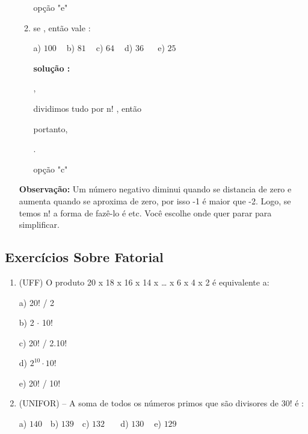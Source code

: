 \begin{multicols*}{2}
\begin{enumerate}
\begin{enumerate}


opção "e"

		\item se , então  vale :

		a) $100 \ \ \ \ $ b) $81 \ \ \ \ $ c) $64 \ \ \ \ $ d) $36 \ \ \ \ \ \ $ e) $25 \ \ $

\textbf{solução :}


,

dividimos tudo por n! , então


portanto, 

.

opção "c"

			\end{enumerate}

						\textbf{Observação:} Um número negativo diminui quando se distancia de zero e aumenta quando se aproxima de zero, por isso -1 é maior que -2. Logo, se temos n! a forma de fazê-lo é  etc. Você escolhe onde quer parar para simplificar.

		\end{enumerate}


		\subsection{Exercícios Sobre Fatorial}

		\begin{enumerate}

	\item  (UFF) O produto 20 x 18 x 16 x 14 x … x 6 x 4 x 2 é equivalente a:

a) 20! / 2

b) 2 $\cdot$ 10!

c) 20! / 2.10!

d) $2^{10} \cdot 10!$

e) 20! / 10!

		\item  (UNIFOR) – A soma de todos os números primos que são divisores de 30! é :
		
		a) $140 \ \ \ $ b) $139 \ \ \ $ c) $132 \ \ \ \ \ \ \ $ d) $130 \ \ \ \ $ e) $129 \ \ $


\end{enumerate}
\end{multicols*}
